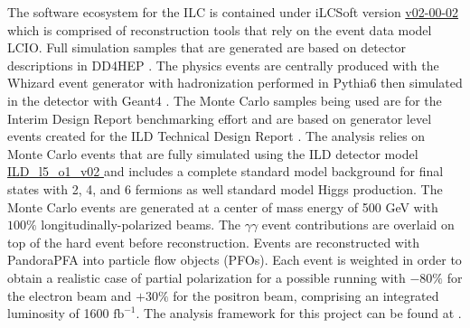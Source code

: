 



The software ecosystem for the ILC is contained under iLCSoft \cite{ilcsoft} version \url{v02-00-02} which is comprised of reconstruction tools that rely on the event data model LCIO\cite{lcio}. Full simulation samples that are generated are based on detector descriptions in DD4HEP \cite{dd4hep}. The physics events are centrally produced with the Whizard event generator \cite{ whizard} with hadronization performed in Pythia6 \cite{pythia6} then simulated in the detector with Geant4 \cite{geant4}. The Monte Carlo samples being used are for the Interim Design Report benchmarking effort \cite{ILDIDR} and are based on generator level events created for the ILD Technical Design Report \cite{tdrdet}. The analysis relies on Monte Carlo events that are fully simulated using the ILD detector model \url{ ILD_l5_o1_v02 } and includes a complete standard model background for final states with 2, 4, and 6 fermions as well standard model Higgs production.  The Monte Carlo events are generated at a center of mass energy of 500 GeV with $100\%$  longitudinally-polarized beams. The $\gamma \gamma$ event contributions are overlaid on top of the hard event before reconstruction. Events are reconstructed with PandoraPFA \cite{particleflowA} into particle flow objects (PFOs). Each event is weighted in order to obtain a realistic case of partial polarization for a possible running with $-80\%$ for the electron beam and $+30\%$ for the positron beam, comprising an integrated luminosity of 1600 $\text{fb}^{-1}$.  The analysis framework for this project can be found at \cite{wwrepo}. 


